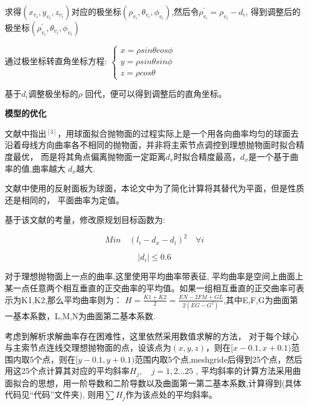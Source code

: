\documentclass[withoutpreface,bwprint]{cumcmthesis} %
\begin{document}
\begin{itemize}
求得$(x_{v_i},y_{v_i},z_{v_i})$对应的极坐标$(\rho_{v_i},\theta_{v_i},\phi_{v_i})$,然后令$\rho_{v_i}^\prime =\rho_{v_i}-d_i$,
得到调整后的极坐标$(\rho_{v_i}^\prime,\theta_{v_i},\phi_{v_i})$ 

 通过极坐标转直角坐标方程: $\begin{cases}
x = \rho sin\theta cos\phi \\
y = \rho sin\theta sin\phi\\
z = \rho cos\theta
\end{cases}$

基于$d_i$调整极坐标的$\rho$ 回代，便可以得到调整后的直角坐标。
\end{itemize}






  
\textbf{模型的优化} 


文献中指出$^{[3]}$，用球面拟合抛物面的过程实际上是一个用各向曲率均匀的球面去
沿着母线方向曲率各不相同的抛物面，并非将主索节点调控到理想抛物面时拟合精度最优，
而是将其角点偏离抛物面一定距离$d_x$时拟合精度最高，$d_x$是一个基于曲率的值,曲率越大
$d_x$越大.

文献中使用的反射面板为球面，本论文中为了简化计算将其替代为平面，但是性质还是相同的，
平面曲率为定值。 

基于该文献的考量，修改原规划目标函数为:




\begin{equation*}
    Min \quad (l_i-d_x-d_i)^2 \quad \forall i
\end{equation*}

\begin{equation}
    |d_i|\leq 0.6
\end{equation}
        

对于理想抛物面上一点的曲率,这里使用平均曲率带表征,
平均曲率是空间上曲面上某一点任意两个相互垂直的正交曲率的平均值。如果一组相互垂直的正交曲率可表示为K1,K2,那么平均曲率则为：
$H = \frac{K1 +K2 }{2}=\frac{EN-2FM+GL}{2(EG-G^2)}$,其中E,F,G为曲面第一基本系数，L,M,N为曲面第二基本系数.


考虑到解析求解曲率存在困难性，这里依然采用数值求解的方法，
对于每个球心与主索节点连线交理想抛物面的点，设该点为$(x,y,z)$，则在$[x-0.1,x+0.1)$范围内取5个点，则在$[y-0.1,y+0.1)$范围内取5个点,meshgride后得到25个点，然后用这25个点计算其对应的平均斜率$H_j,\quad j =1,2...25$ ,
平均斜率的计算方法采用曲面拟合的思想，用一阶导数和二阶导数以及曲面第一第二基本系数,计算得到(具体代码见“代码”文件夹), 则用$\sum H_j$作为该点处的平均斜率。
\end{document}
